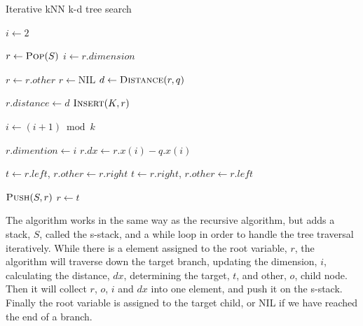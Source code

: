 \begin{algorithm}
\caption{Iterative kNN k-d tree search}
\label{alg:iterative_knn_kd_tree_search}
\begin{algorithmic}
        \State {}

        \State $i \gets 2$

                \State $r \gets \Call{Pop}{S}$
                \State $i \gets r.dimension$

                 
                    \State $r \gets r.other$
                \Else
                    \State $r \gets \text{NIL}$
                \EndIf
            \Else
                \State $d \gets \Call{Distance}{r, q}$

                 
                    \State $r.distance \gets d$
                    \State $\Call{Insert}{K, r}$
                \EndIf

                \State $i \gets (i + 1) \bmod k$ 

                \State $r.dimention \gets i$
                \State $r.dx \gets r.x(i) - q.x(i)$

                  
                    \State $t \gets r.left$, $r.other \gets r.right$
                \Else
                    \State $t \gets r.right$, $r.other \gets r.left$
                \EndIf

                \State $\Call{Push}{S, r}$
                \State $r \gets t$
            \EndIf

        \EndWhile
    \EndProcedure
\end{algorithmic}
\end{algorithm}

The algorithm works in the same way as the recursive algorithm, but adds a stack, $S$, called the s-stack, and a while loop in order to handle the tree traversal iteratively. While there is a element assigned to the root variable, $r$, the algorithm will traverse down the target branch, updating the dimension, $i$, calculating the distance, $dx$, determining the target, $t$, and other, $o$, child node. Then it will collect $r$, $o$, $i$ and $dx$ into one element, and push it on the s-stack. Finally the root variable is assigned to the target child, or NIL if we have reached the end of a branch.

